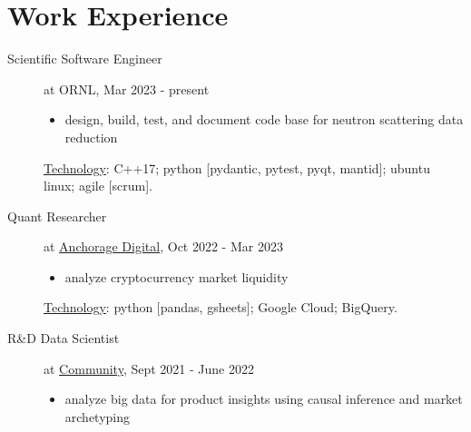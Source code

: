 \documentclass[11pt, letter]{article}
\begin{document}
\section*{Work Experience}
\begin{minipage}{\textwidth}
	\begin{description}
	\item[Scientific Software Engineer] at ORNL, Mar 2023 - present
		\vspace{-0.5\baselineskip}
		\begin{itemize}
			\item design, build, test, and document code base for neutron scattering data reduction
		\end{itemize}
		\vspace{-0.5\baselineskip}
		\underline{Technology}: 
		C++17; python [pydantic, pytest, pyqt, mantid]; ubuntu linux; agile [scrum].
	\item[Quant Researcher] at \href{https://www.anchorage.com}{Anchorage Digital}, Oct 2022 - Mar 2023
		\vspace{-0.5\baselineskip}
		\begin{itemize}
			\item analyze cryptocurrency market liquidity
		\end{itemize}
		\vspace{-0.5\baselineskip}
		\underline{Technology}: 
		python [pandas, gsheets]; Google Cloud; BigQuery.
	\item[R\&D Data Scientist] at \href{https://www.community.com/about-us}{Community}, Sept 2021 - June 2022
		\vspace{-0.5\baselineskip}
		\begin{itemize}
			\item analyze big data for product insights using causal inference and market archetyping%
		\end{itemize}
		\vspace{-0.5\baselineskip}

\end{description}
\end{minipage}
\end{document}

